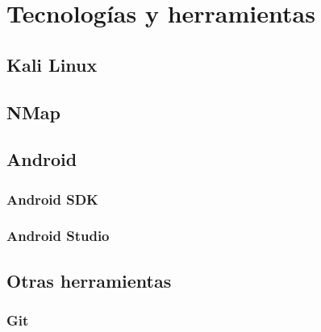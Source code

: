 \chapter{Tecnologías y herramientas}

\section{Kali Linux}


\section{NMap}


\section{Android}

\subsection{Android SDK}

\subsection{Android Studio}


\section{Otras herramientas}

\subsection{Git}